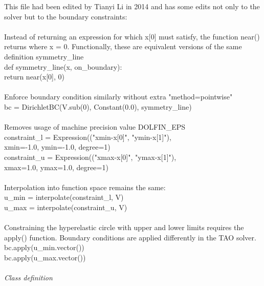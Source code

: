 \documentclass[12pt,3p]{article}
\begin{document}
This file had been edited by Tianyi Li in 2014 and has some edits not only to the solver but to the boundary constraints: \\ \\
Instead of returning an expression for which x[0] must satisfy, the function {\selectfont near()} returns where x = 0. Functionally, these are equivalent versions of the same definition {\selectfont symmetry\_line} \\
{\selectfont
def symmetry\_line(x, on\_boundary): \\
\indent \indent return near(x[0], 0) \\ \\
}
Enforce boundary condition similarly without extra {\selectfont "method=pointwise"} \\
{\selectfont
bc = DirichletBC(V.sub(0), Constant(0.0), symmetry\_line) \\ \\
}
Removes usage of machine precision value {\selectfont DOLFIN\_EPS} \\
{\selectfont
constraint\_l = Expression(("xmin-x[0]", "ymin-x[1]"), \\
\indent \indent \indent \indent \indent \indent \indent \indent \indent \indent \indent \indent xmin=-1.0, ymin=-1.0, degree=1) \\
constraint\_u = Expression(("xmax-x[0]", "ymax-x[1]"), \\
\indent \indent \indent \indent \indent \indent \indent \indent \indent \indent \indent \indent xmax=1.0, ymax=1.0, degree=1) \\ \\
}
Interpolation into function space remains the same: \\
{\selectfont
u\_min = interpolate(constraint\_l, V) \\ 
u\_max = interpolate(constraint\_u, V) \\ \\
}
Constraining the hyperelastic circle with upper and lower limits requires the {\selectfont apply()} function. Boundary conditions are applied differently in the TAO solver.\\
{\selectfont
bc.apply(u\_min.vector()) \\
bc.apply(u\_max.vector()) \\ \\
}
\textit{Class definition} \\
\end{document}
